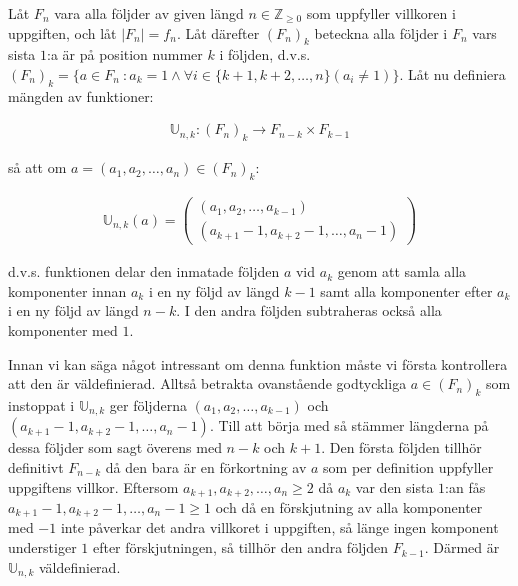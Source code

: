 \documentclass{tufte-handout}
\begin{document}
\begin{ans}
    Låt $F_n$ vara alla följder av given längd $n \in \mathbb{Z}_{\geq 0}$ som uppfyller villkoren i uppgiften, och låt $|F_n| = f_n$. Låt därefter $(F_n)_k$ beteckna alla följder i $F_n$ vars sista $1$:a är på position nummer $k$ i följden, d.v.s. $(F_n)_k = \{a \in F_n\ : a_k = 1 \land \forall i \in \{k+1, k+2, \ldots, n\}(a_i \neq 1)\}$. Låt nu definiera mängden av funktioner:

    \vspace{-3mm}
    
    \begin{align*}
        \mathbb{U}_{n, k} : (F_n)_k \rightarrow F_{n-k} \times F_{k-1}
    \end{align*}

    så att om $a = (a_1, a_2, \ldots, a_n) \in (F_n)_k$:

    \vspace{-3mm}

    \begin{align*}
        \mathbb{U}_{n,k}(a) = \begin{pmatrix} (a_1, a_2, \ldots, a_{k-1}) \\ (a_{k+1} - 1, a_{k+2} - 1, \ldots, a_{n} - 1) \end{pmatrix}
    \end{align*}

    d.v.s. funktionen delar den inmatade följden $a$ vid $a_k$ genom att samla alla komponenter innan $a_k$ i en ny följd av längd $k-1$ samt alla komponenter efter $a_k$ i en ny följd av längd $n-k$. I den andra följden subtraheras också alla komponenter med $1$.

    \vspace{3mm}

    Innan vi kan säga något intressant om denna funktion måste vi första kontrollera att den är väldefinierad. Alltså betrakta ovanstående godtyckliga $a \in (F_n)_k$ som instoppat i $\mathbb{U}_{n, k}$ ger följderna $(a_1, a_2, \ldots, a_{k-1})$ och $(a_{k+1} - 1, a_{k+2} - 1, \ldots, a_{n} - 1)$. Till att börja med så stämmer längderna på dessa följder som sagt överens med $n-k$ och $k + 1$. Den första följden tillhör definitivt $F_{n-k}$ då den bara är en förkortning av $a$ som per definition uppfyller uppgiftens villkor. Eftersom $a_{k+1}, a_{k+2}, \ldots, a_n \geq 2$ då $a_k$ var den sista $1$:an fås $a_{k+1} - 1, a_{k+2} - 1, \ldots, a_n - 1 \geq 1$ och då en förskjutning av alla komponenter med $-1$ inte påverkar det andra villkoret i uppgiften, så länge ingen komponent understiger $1$ efter förskjutningen, så tillhör den andra följden $F_{k-1}$. Därmed är $\mathbb{U}_{n, k}$ väldefinierad.


\end{ans}
\end{document}
